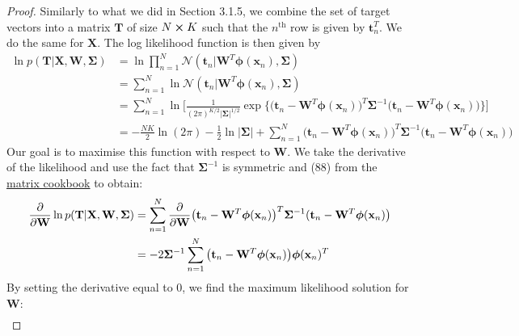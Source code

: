 \vspace{1em}

\begin{proof}
    Similarly to what we did in Section 3.1.5, we combine
    the set of target vectors into a matrix $\mathbf{T}$ of
    size $N \cross K$ such that the $n^{\text{th}}$ row
    is given by $\mathbf{t}_n^T$. We do the same for
    $\mathbf{X}$. The log likelihood 
    function is then given by
    \begin{align*}
        \ln p(\mathbf{T} | \mathbf{X}, \mathbf{W}, \mathbf{\Sigma})
        &= \ln \prod_{n = 1}^N 
            \mathcal{N}(\mathbf{t}_n | \mathbf{W}^T\bm{\phi}(\mathbf{x}_n), \mathbf{\Sigma}) \\
        &= \sum_{n=1}^{N} 
            \ln \mathcal{N}(\mathbf{t}_n | \mathbf{W}^T\bm{\phi}(\mathbf{x}_n), \mathbf{\Sigma}) \\
        &= \sum_{n=1}^{N} \ln \bigg[\frac{1}{(2\pi)^{K/2}|\mathbf{\Sigma}|^{1/2}}
            \exp\big\{\big(\mathbf{t}_n - \mathbf{W}^T \bm{\phi}(\mathbf{x}_n)\big)^T
            \mathbf{\Sigma}^{-1}(\mathbf{t}_n - \mathbf{W}^T \bm{\phi}(\mathbf{x}_n)\big)
        \big\}\bigg] \\
        &= -\frac{NK}{2} \ln(2\pi) - \frac{1}{2} \ln|\mathbf{\Sigma}| 
            + \sum_{n=1}^{N} \big(\mathbf{t}_n - \mathbf{W}^T \bm{\phi}(\mathbf{x}_n)\big)^T
            \mathbf{\Sigma}^{-1}(\mathbf{t}_n - \mathbf{W}^T \bm{\phi}(\mathbf{x}_n)\big)
    \end{align*}
    Our goal is to maximise this function with respect to $\mathbf{W}$.
    We take the derivative of the likelihood and use the fact that
    $\mathbf{\Sigma}^{-1}$ is symmetric and (88) from the 
    \href{https://www.math.uwaterloo.ca/~hwolkowi/matrixcookbook.pdf}{matrix cookbook}
    to obtain:
    \begin{align*}
        \pdv{\mathbf{W}} \ln p(\mathbf{T} | \mathbf{X}, \mathbf{W}, \mathbf{\Sigma})
        &= \sum_{n=1}^{N} \pdv{\mathbf{W}} 
            \big(\mathbf{t}_n - \mathbf{W}^T \bm{\phi}(\mathbf{x}_n)\big)^T
            \mathbf{\Sigma}^{-1}(\mathbf{t}_n - \mathbf{W}^T \bm{\phi}(\mathbf{x}_n)\big) \\
        &= -2\mathbf{\Sigma}^{-1} \sum_{n=1}^{N} \big(\mathbf{t}_n - \mathbf{W}^T\bm{\phi}(\mathbf{x}_n)\big)
            \bm{\phi}(\mathbf{x}_n)^T
    \end{align*}
    By setting the derivative equal to 0, we find the maximum likelihood
    solution for $\mathbf{W}$:
    \begin{align*}

\end{align*}
\end{proof}
